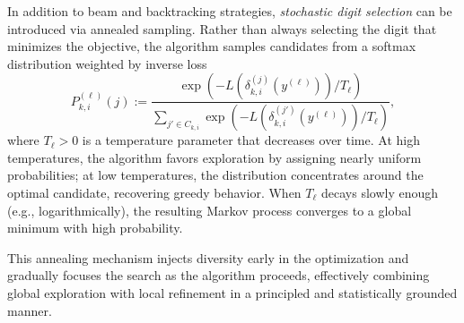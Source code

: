 \documentclass[aps,twocolumn,superscriptaddress,nofootinbib]{revtex4}
\begin{document}
In addition to beam and backtracking strategies, \emph{stochastic digit selection} can be introduced via annealed sampling. Rather than always selecting the digit that minimizes the objective, the algorithm samples candidates from a softmax distribution weighted by inverse loss
\begin{equation}
    P^{(\ell)}_{k,i}(j) := \frac{\exp\left(-L\left(\delta^{(j)}_{k,i}(y^{(\ell)})\right)/T_\ell\right)}{\sum_{j' \in C_{k,i}} \exp\left(-L\left(\delta^{(j')}_{k,i}(y^{(\ell)})\right)/T_\ell\right)}, \label{eq:annealed-sampling}
\end{equation}
where $T_\ell > 0$ is a temperature parameter that decreases over time. At high temperatures, the algorithm favors exploration by assigning nearly uniform probabilities; at low temperatures, the distribution concentrates around the optimal candidate, recovering greedy behavior. When $T_\ell$ decays slowly enough (e.g., logarithmically), the resulting Markov process converges to a global minimum with high probability.

This annealing mechanism injects diversity early in the optimization and gradually focuses the search as the algorithm proceeds, effectively combining global exploration with local refinement in a principled and statistically grounded manner.
\end{document}
